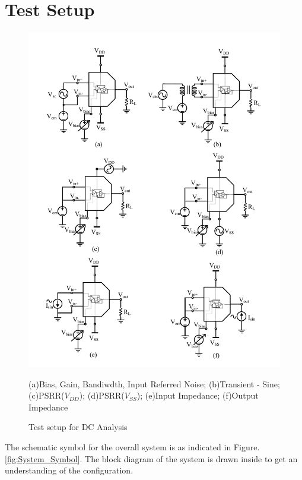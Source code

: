 \section{Test Setup}
\begin{figure} [H]
\centering
\includegraphics[scale=0.85]{Figures/Test_Benches/Overall_TB.pdf}
\caption{Test setup for DC Analysis}
\label{fig:TB}
(a)Bias, Gain, Bandiwdth, Input Referred Noise; (b)Transient - Sine; (c)PSRR($V_{DD}$); (d)PSRR($V_{SS}$); (e)Input Impedance; (f)Output Impedance
\end{figure}

The schematic symbol for the overall system is as indicated in Figure.\ref{fig:System_Symbol}. The block diagram of the system is drawn inside to get an understanding of the configuration.

